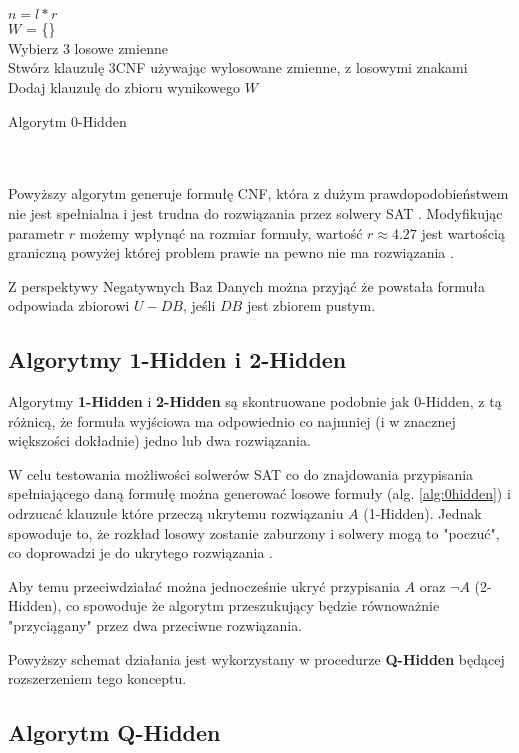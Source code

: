  ~\\\\
 \begin{algorithm}[H]
     \SetAlgoLined
     
     
     $n = l * r$\\
     $W$ = \{\}\\
     {
         Wybierz 3 losowe zmienne\\
         Stwórz klauzulę 3CNF używając wylosowane zmienne, z losowymi znakami\\
         Dodaj klauzulę do zbioru wynikowego $W$
     } 
     
     \caption{Algorytm 0-Hidden}
     \label{alg:0hidden}
 \end{algorithm}
 ~\\\\
Powyższy algorytm generuje formułę CNF, która z dużym prawdopodobieństwem nie jest spełnialna i jest trudna do rozwiązania przez solwery SAT \cite{GeneratingHardFormulasByHidingSolutionsDeceptively, HidingSatisfyingAssignmentsTwoAreBetterThanOne}.
Modyfikując parametr $r$ możemy wpłynąć na rozmiar formuły, wartość $r \approx 4.27$ jest wartością graniczną powyżej której problem prawie na pewno nie ma rozwiązania \cite{GeneratingHardFormulasByHidingSolutionsDeceptively}.

Z perspektywy Negatywnych Baz Danych można przyjąć że powstała formuła odpowiada zbiorowi $U - DB$, jeśli $DB$ jest zbiorem pustym.

\subsection{Algorytmy 1-Hidden i 2-Hidden}
Algorytmy \textbf{1-Hidden} i \textbf{2-Hidden} są skontruowane podobnie jak 0-Hidden, z tą różnicą, że formuła wyjściowa ma odpowiednio co najmniej (i w znacznej większości dokładnie) jedno lub dwa rozwiązania.  
 
W celu testowania możliwości solwerów SAT co do znajdowania przypisania spełniającego daną formułę można generować losowe formuły (alg. \ref{alg:0hidden}) i odrzucać klauzule które
przeczą ukrytemu rozwiązaniu $A$ (1-Hidden). Jednak spowoduje to, że rozkład losowy zostanie zaburzony i solwery mogą to "poczuć", co doprowadzi je do ukrytego rozwiązania \cite{HidingSatisfyingAssignmentsTwoAreBetterThanOne}.
    
Aby temu przeciwdziałać można jednocześnie ukryć przypisania $A$ oraz $\neg A$ (2-Hidden), co spowoduje że algorytm przeszukujący będzie równoważnie "przyciągany" przez dwa przeciwne rozwiązania.

Powyższy schemat działania jest wykorzystany w procedurze \textbf{Q-Hidden} będącej rozszerzeniem tego konceptu.


\subsection{Algorytm Q-Hidden}



